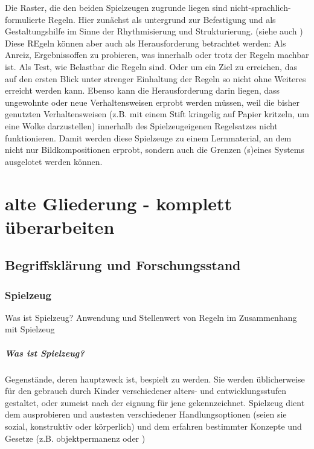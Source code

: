 \documentclass[11pt,a4paper,twoside]{scrreprt}
\begin{document}
Die Raster, die den beiden Spielzeugen zugrunde liegen sind nicht-sprachlich-formulierte Regeln. Hier zunächst als untergrund zur Befestigung und als Gestaltungshilfe im Sinne der Rhythmisierung und Strukturierung. (siehe auch \cite{formfindung}
)
Diese REgeln können aber auch als Herausforderung betrachtet werden: Als Anreiz, Ergebnissoffen zu probieren, was innerhalb oder trotz der Regeln machbar ist. Als Test, wie Belastbar die Regeln sind. Oder um ein Ziel zu erreichen, das auf den ersten Blick unter strenger Einhaltung der Regeln so nicht ohne Weiteres erreicht werden kann. Ebenso kann die Herausforderung darin liegen, dass ungewohnte oder neue Verhaltensweisen erprobt werden müssen, weil die bisher genutzten Verhaltensweisen (z.B. mit einem Stift kringelig auf Papier kritzeln, um eine Wolke darzustellen) innerhalb des Spielzeugeigenen Regelsatzes nicht funktionieren. Damit werden diese Spielzeuge zu einem Lernmaterial, an dem nicht nur Bildkompositionen erprobt, sondern auch die Grenzen (s)eines Systems ausgelotet werden können.


\part{alte Gliederung - komplett überarbeiten}

\chapter{Begriffsklärung und Forschungsstand}

	\section{Spielzeug}
	Was ist Spielzeug? Anwendung und Stellenwert von Regeln im Zusammenhang mit Spielzeug
		\subsubsection{Was ist Spielzeug?}

Gegenstände, deren hauptzweck ist, bespielt zu werden. Sie werden üblicherweise für den gebrauch durch Kinder verschiedener alters- und entwicklungsstufen gestaltet, oder zumeist nach der eignung für jene gekennzeichnet.
Spielzeug dient dem ausprobieren und austesten verschiedener Handlungsoptionen (seien sie sozial, konstruktiv oder körperlich) und dem erfahren bestimmter Konzepte und Gesetze (z.B. objektpermanenz oder )
\end{document}
